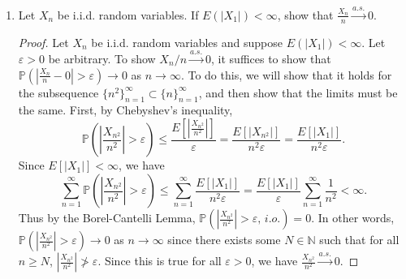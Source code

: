 \documentclass[11pt,oneside,english]{amsart}
\theoremstyle{definition}
\newcommand{\ve}{\varepsilon}
\newcommand{\MB}[1]{\mathbb{#1}}
\newcommand{\1}{\mathbbm{1}}
\newcommand{\p}{\mathbb{P}}
\begin{document}
\begin{enumerate}[leftmargin=*]
\pagebreak







\item Let $X_n$ be i.i.d. random variables. If $E(|X_1|)<\infty$, show that $\frac{X_n}{n}  \xrightarrow{a.s.}0$.

\begin{proof}
Let $X_n$ be i.i.d. random variables and suppose $E(|X_1|)<\infty$. Let $\ve>0$ be arbitrary. To show $X_n/n  \xrightarrow{a.s.}0$, it suffices to show that $\p\left(\left|\frac{X_n}{n}-0\right|>\ve\right)\to0$ as $n\to\infty$. To do this, we will show that it holds for the subsequence $\{n^2\}_{n=1}^\infty\subset\{n\}_{n=1}^\infty$, and then show that the limits must be the same. First, by Chebyshev's inequality,
\[
\p\left(\left|\frac{X_{n^2}}{n^2}\right|>\ve\right)\leq \frac{E\left[\left|\frac{X_{n^2}}{n^2}\right|\right]}{\ve}=\frac{E\left[\left|X_{n^2}\right|\right]}{n^2\ve}=\frac{E\left[\left|X_{1}\right|\right]}{n^2\ve}.
\]
Since $E[|X_1|]<\infty$, we have
\[
\sum_{n=1}^\infty \p\left(\left|\frac{X_{n^2}}{n^2}\right|>\ve\right)\leq\sum_{n=1}^\infty \frac{E\left[\left|X_{1}\right|\right]}{n^2\ve}=\frac{E[|X_1|]}{\ve}\sum_{n=1}^\infty\frac{1}{n^2}<\infty.
\]
Thus by the Borel-Cantelli Lemma, $\p\left(\left|\frac{X_{n^2}}{n^2}\right|>\ve,\,i.o.\right)=0$. In other words, $\p\left(\left|\frac{X_{n^2}}{n^2}\right|>\ve\right)\to0$ as $n\to\infty$ since there exists some $N\in\MB{N}$ such that for all $n\geq N$, $\left|\frac{X_{n^2}}{n^2}\right|\not>\ve$. Since this is true for all $\ve>0$, we have $\frac{X_{n^2}}{n^2}  \xrightarrow{a.s.}0$.


\end{proof}
\end{enumerate}
\end{document}

